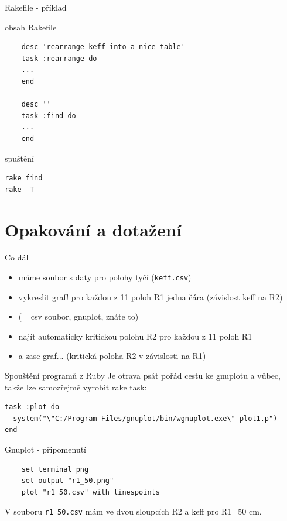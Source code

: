 \documentclass{beamer}
\begin{document}
\begin{frame}[fragile]{Rakefile - příklad}
  \begin{block}{obsah Rakefile}
        \scriptsize
    \begin{verbatim}
    desc 'rearrange keff into a nice table'
    task :rearrange do
    ...
    end

    desc ''
    task :find do
    ...
    end
    \end{verbatim}
  \end{block}
  \begin{block}{spuštění}
        \scriptsize
    \begin{verbatim}
rake find
rake -T
    \end{verbatim}
  \end{block}
\end{frame}

\section{Opakování a dotažení}

\begin{frame}{Co dál}
  \begin{itemize}
    \item máme soubor s daty pro polohy tyčí (\texttt{keff.csv})
    \item vykreslit graf! pro každou z 11 poloh R1 jedna čára (závislost keff na R2)
    \item (= csv soubor, gnuplot, znáte to)
    \item najít automaticky kritickou polohu R2 pro každou z 11 poloh R1
    \item a zase graf... (kritická poloha R2 v závislosti na R1)
  \end{itemize}
\end{frame}


\begin{frame}[fragile]{Spouštění programů z Ruby}
  Je otrava psát pořád cestu ke gnuplotu a vůbec, takže lze samozřejmě vyrobit rake task:
    \scriptsize
\begin{verbatim}
task :plot do
  system("\"C:/Program Files/gnuplot/bin/wgnuplot.exe\" plot1.p")
end
\end{verbatim}
\end{frame}

\begin{frame}[fragile]{Gnuplot - připomenutí}
  \begin{verbatim}
    set terminal png
    set output "r1_50.png"
    plot "r1_50.csv" with linespoints
  \end{verbatim}
  V souboru \texttt{r1\_50.csv} mám ve dvou sloupcích R2 a keff pro R1=50 cm.
\end{frame}
\end{document}
